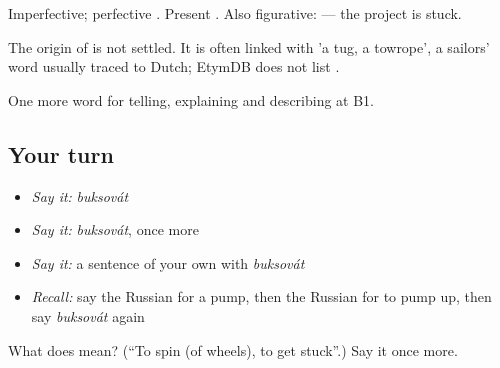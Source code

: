 Imperfective; perfective \emph{}. Present \emph{}. Also figurative: \emph{ } — the project is stuck.

\begin{cousinweb}
The origin of \emph{} is not settled. It is often linked with \emph{} 'a tug, a towrope', a sailors' word usually traced to Dutch; EtymDB does not list \emph{}.
\end{cousinweb}

\begin{grammarlens}[title={What you've built}]
One more word for telling, explaining and describing at B1.
\end{grammarlens}

\subsection*{Your turn}
\begin{itemize}
\raggedright
  \item \emph{Say it:} \emph{buksovát}
  \item \emph{Say it:} \emph{buksovát}, once more
  \item \emph{Say it:} a sentence of your own with \emph{buksovát}
  \item \emph{Recall:} say the Russian for a pump, then the Russian for to pump up, then say \emph{buksovát} again
\end{itemize}

\begin{tcolorbox}[breakable,colback=teal!4,colframe=teal!35!black,title={Before you move on}]
What does  mean? (\textquotedblleft{}To spin (of wheels), to get stuck\textquotedblright{}.) Say it once more.
\end{tcolorbox}
